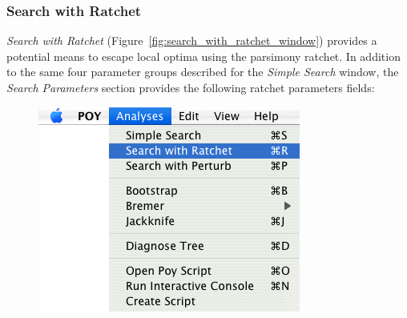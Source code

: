 \subsubsection{Search with Ratchet}

\emph{Search with Ratchet} (Figure~\ref{fig:search_with_ratchet_window}) provides a potential means to escape local optima using the parsimony ratchet. In addition to the same four parameter groups described for the \emph{Simple Search} window, the \emph{Search Parameters} section provides the following ratchet parameters fields:

\begin{figure}
\centering
\begin{minipage}[c]{0.48\textwidth}
   		\includegraphics[width=\textwidth]{figures/searchwithratchet_menu.jpg}
\end{minipage}
\quad
\begin{minipage}[c]{0.48\textwidth}

\end{minipage}
\end{figure}
